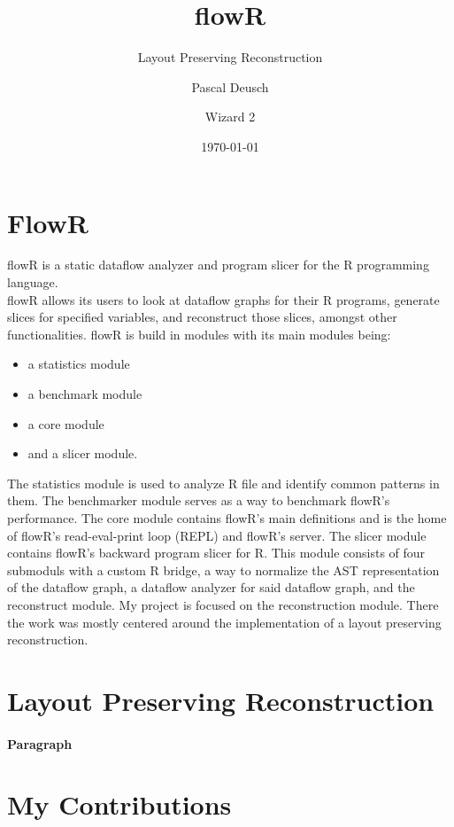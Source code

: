 \documentclass[a3paper, portrait, english, default]{uulm-cs-poster}
\title{flowR}
\subtitle{Layout Preserving Reconstruction}
\author{Pascal Deusch\and Wizard 2}
\institute{Institut für Software Engineering und Programiersprachen}
\date{\today}
\begin{document}
\maketitle
\begin{multicols}{2}
\section*{FlowR}
	flowR is a static dataflow analyzer and program slicer for the R programming language.\\%
	flowR allows its users to look at dataflow graphs for their R programs, generate slices for specified variables, and reconstruct those slices, amongst other functionalities.
	flowR is build in modules with its main modules being:
   \begin{itemize}
      \item a statistics module
      \item a benchmark module
	  \item a core module
      \item and a slicer module.
   \end{itemize}
	The statistics module is used to analyze R file and identify common patterns in them. The benchmarker module serves as a way to benchmark flowR's performance.
	The core module contains flowR's main definitions and is the home of flowR's read-eval-print loop (REPL) and flowR's server. The slicer module contains flowR's backward program slicer for R. This module consists of four submoduls with a custom R bridge, a way to normalize the AST representation of the dataflow graph, a dataflow analyzer for said dataflow graph, and the reconstruct module.
	My project is focused on the reconstruction module. There the work was mostly centered around the implementation of a layout preserving reconstruction.
\section*{Layout Preserving Reconstruction}
   \lipsum[4-6]
   \paragraph{Paragraph}\lipsum[7]
\end{multicols}
\section*{My Contributions}
\begin{multicols}{4}
   \lipsum[2]
   \printbibliography
\end{multicols}
\end{document}
